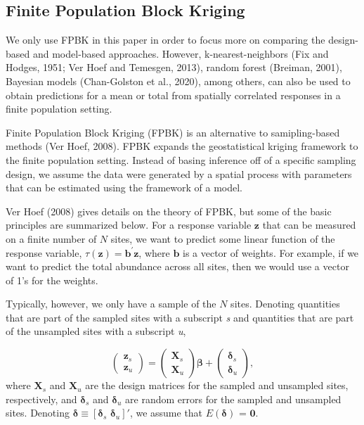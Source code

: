 \documentclass[]{elsarticle} %
\begin{document}
\hypertarget{finite-population-block-kriging}{%
\subsection{Finite Population Block
Kriging}\label{finite-population-block-kriging}}

We only use FPBK in this paper in order to focus more on comparing the
design-based and model-based approaches. However, k-nearest-neighbors
(Fix and Hodges, 1951; Ver Hoef and Temesgen, 2013), random forest
(Breiman, 2001), Bayesian models (Chan-Golston et al., 2020), among
others, can also be used to obtain predictions for a mean or total from
spatially correlated responses in a finite population setting.

Finite Population Block Kriging (FPBK) is an alternative to
samipling-based methods (Ver Hoef, 2008). FPBK expands the
geostatistical kriging framework to the finite population setting.
Instead of basing inference off of a specific sampling design, we assume
the data were generated by a spatial process with parameters that can be
estimated using the framework of a model.

Ver Hoef (2008) gives details on the theory of FPBK, but some of the
basic principles are summarized below. For a response variable
\(\mathbf{z}\) that can be measured on a finite number of \(N\) sites,
we want to predict some linear function of the response variable,
\(\tau(\mathbf{z}) = \mathbf{b}^\prime \mathbf{z}\), where
\(\mathbf{b}\) is a vector of weights. For example, if we want to
predict the total abundance across all sites, then we would use a vector
of 1's for the weights.

Typically, however, we only have a sample of the \(N\) sites. Denoting
quantities that are part of the sampled sites with a subscript \emph{s}
and quantities that are part of the unsampled sites with a subscript
\emph{u},

\begin{equation}
\begin{pmatrix} \label{equation:Zmarginal}
    \mathbf{z}_s      \\
    \mathbf{z}_u
\end{pmatrix}
=
\begin{pmatrix}
  \mathbf{X}_s    \\
  \mathbf{X}_u
\end{pmatrix}
\bm{\beta} +
\begin{pmatrix}
\bm{\delta}_s    \\
\bm{\delta}_u
\end{pmatrix},
\end{equation} where \(\mathbf{X}_s\) and \(\mathbf{X}_u\) are the
design matrices for the sampled and unsampled sites, respectively, and
\(\bm{\delta}_s\) and \(\bm{\delta}_u\) are random errors for the
sampled and unsampled sites. Denoting
\(\bm{\delta} \equiv [\bm{\delta}_s \,\, \bm{\delta}_u]'\), we assume
that \(E(\bm{\delta})\) = \(\mathbf{0}\).
\end{document}
